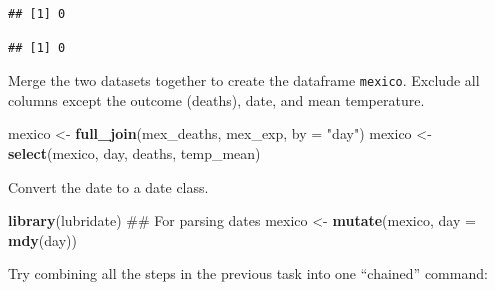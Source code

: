 \documentclass[]{book}
\makeatletter
\newenvironment{Shaded}{\begin{snugshade}}{\end{snugshade}}
\newcommand{\KeywordTok}[1]{\textcolor[rgb]{0.13,0.29,0.53}{\textbf{#1}}}
\newcommand{\DataTypeTok}[1]{\textcolor[rgb]{0.13,0.29,0.53}{#1}}
\newcommand{\StringTok}[1]{\textcolor[rgb]{0.31,0.60,0.02}{#1}}
\newcommand{\OperatorTok}[1]{\textcolor[rgb]{0.81,0.36,0.00}{\textbf{#1}}}
\newcommand{\NormalTok}[1]{#1}
\newenvironment{kframe}{%
\medskip{}
\setlength{\fboxsep}{.8em}
 \def\at@end@of@kframe{}%
 \ifinner\ifhmode%
  \def\at@end@of@kframe{\end{minipage}}%
  \begin{minipage}{\columnwidth}%
 \fi\fi%
 \def\FrameCommand##1{\hskip\@totalleftmargin \hskip-\fboxsep
 \colorbox{shadecolor}{##1}\hskip-\fboxsep
     \hskip-\linewidth \hskip-\@totalleftmargin \hskip\columnwidth}%
 \MakeFramed {\advance\hsize-\width
   \@totalleftmargin\z@ \linewidth\hsize
   \@setminipage}}%
 {\par\unskip\endMakeFramed%
 \at@end@of@kframe}
\renewenvironment{Shaded}{\begin{kframe}}{\end{kframe}}
\theoremstyle{definition}
\theoremstyle{definition}
\theoremstyle{definition}
\theoremstyle{remark}
\makeatother
\begin{document}
\begin{verbatim}
## [1] 0
\end{verbatim}

\begin{Shaded}
\end{Shaded}

\begin{verbatim}
## [1] 0
\end{verbatim}

Merge the two datasets together to create the dataframe \texttt{mexico}.
Exclude all columns except the outcome (deaths), date, and mean
temperature.

\begin{Shaded}
\begin{Highlighting}[]
\NormalTok{mexico <-}\StringTok{ }\KeywordTok{full_join}\NormalTok{(mex_deaths, mex_exp, }\DataTypeTok{by =} \StringTok{"day"}\NormalTok{) }
\NormalTok{mexico <-}\StringTok{ }\KeywordTok{select}\NormalTok{(mexico, day, deaths, temp_mean)}
\end{Highlighting}
\end{Shaded}

Convert the date to a date class.

\begin{Shaded}
\begin{Highlighting}[]
\KeywordTok{library}\NormalTok{(lubridate) ## For parsing dates}
\NormalTok{mexico <-}\StringTok{ }\KeywordTok{mutate}\NormalTok{(mexico, }\DataTypeTok{day =} \KeywordTok{mdy}\NormalTok{(day))}
\end{Highlighting}
\end{Shaded}

Try combining all the steps in the previous task into one ``chained''
command:

\begin{Shaded}
\end{Shaded}
\end{document}
